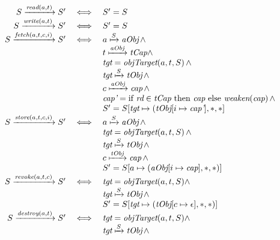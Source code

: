 \begin{figure}
  \[
  \begin{array}{rclll}
    \FNsingleOp{S}{\FNread{a}{t}}{S'} & \iff & \multicolumn{3}{l}{S' = S} \\
    \FNsingleOp{S}{\FNwrite{a}{t}}{S'} & \iff & \multicolumn{3}{l}{S' = S} \\
    \FNsingleOp{S}{\FNfetch{a}{t}{c}{i}}{S'} & \iff & \multicolumn{3}{l}{\mapsTo{a}{\ident{aObj}}{S} \, \wedge} \\
    & & \multicolumn{3}{l}{\mapsTo{t}{\ident{tCap}}{\ident{aObj}} \wedge} \\
    & & \multicolumn{3}{l}{\ident{tgt} = \FNobjTarget{a}{t}{S} \, \wedge} \\
    & & \multicolumn{3}{l}{\mapsTo{\ident{tgt}}{\ident{tObj}}{S} \, \wedge} \\
    & & \multicolumn{3}{l}{\mapsTo{c}{\ident{cap}}{\ident{aObj}} \, \wedge} \\
    & & \multicolumn{3}{l}{\ident{cap'} = \text{if } \NMrd \in \ident{tCap} \text{ then } \ident{cap} \text{ else } \FNweaken{\ident{cap}} \, \land} \\ 
    & & \multicolumn{3}{l}{S' = S[\ident{tgt} \mapsto (\ident{tObj}[i \mapsto \ident{cap'}],\noident{*},\noident{*} ]} \\
    \FNsingleOp{S}{\FNstore{a}{t}{c}{i}}{S'} & \iff & \multicolumn{3}{l}{\mapsTo{a}{\ident{aObj}}{S} \, \wedge} \\
    & & \multicolumn{3}{l}{\ident{tgt} = \FNobjTarget{a}{t}{S} \, \wedge} \\
    & & \multicolumn{3}{l}{\mapsTo{\ident{tgt}}{\ident{tObj}}{S} \, \wedge} \\
    & & \multicolumn{3}{l}{\mapsTo{c}{\ident{cap}}{\ident{tObj}} \, \wedge} \\
    & & \multicolumn{3}{l}{S' = S[a \mapsto (\ident{aObj}[i \mapsto \ident{cap}],\noident{*},\noident{*}) ]} \\
    \FNsingleOp{S}{\FNrevoke{a}{t}{c}}{S'} & \iff & \multicolumn{3}{l}{\ident{tgt} = \FNobjTarget{a}{t}{S} \wedge} \\
    & & \multicolumn{3}{l}{\mapsTo{\ident{tgt}}{\ident{tObj}}{S} \, \wedge} \\
    & & \multicolumn{3}{l}{S' = S[\ident{tgt} \mapsto (\ident{tObj}[c \mapsto \epsilon],\noident{*},\noident{*}) ]} \\
    \FNsingleOp{S}{\FNdestroy{a}{t}}{S'} & \iff & \multicolumn{3}{l}{\ident{tgt} = \FNobjTarget{a}{t}{S} \wedge} \\
    & & \multicolumn{3}{l}{\mapsTo{\ident{tgt}}{\ident{tObj}}{S} \, \wedge} \\

\end{array}\]
\end{figure}

